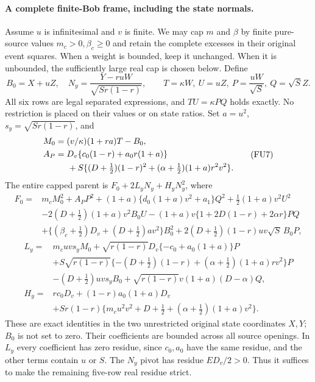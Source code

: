 \paragraph{A complete finite-Bob frame, including the state normals.}
Assume $u$ is infinitesimal and $v$ is finite. We may cap $m$ and
$\beta$ by finite pure-source values $m_c>0,\beta_c\ge0$ and
retain the complete excesses in their original event squares.
When a weight is bounded, keep it unchanged. When it is unbounded,
the sufficiently large real cap is chosen below. Define
\[
 B_0=X+uZ,\quad N_y=\frac{Y-ruW}{\sqrt{Sr(1-r)}},\qquad
 T=\kappa W,\ U=uZ,\ P=\frac{uW}{\sqrt S},\ Q=\sqrt S Z.
 \tag{FU6}
\]
All six rows are legal separated expressions, and $TU=\kappa PQ$
holds exactly. No restriction is placed on their values or on state
ratios. Set $a=u^2$, $s_y=\sqrt{Sr(1-r)}$, and
\[
\begin{split}
 M_0&=(v/\kappa)(1+ra)T-B_0,\\
 A_P&=D_v\{c_0(1-r)+a_0r(1+a)\}\\
 &\hspace{5mm}+S\{(D+\tfrac12)(1-r)^2
       +(\alpha+\tfrac12)(1+a)r^2v^2\}.
\end{split}\tag{FU7}
\]
The entire capped parent is $F_0+2L_yN_y+H_yN_y^2$, where
\[
\begin{split}
 F_0={}&m_cM_0^2+A_PP^2+(1+a)\{d_0(1+a)v^2+a_1\}Q^2
                   +\tfrac12(1+a)v^2U^2\\
 &-2(D+\tfrac12)(1+a)v^2B_0U
 -(1+a)v\{1+2D(1-r)+2\alpha r\}PQ\\
 &+\{(\beta_c+\tfrac12)D_v+(D+\tfrac12)av^2\}B_0^2
 +2(D+\tfrac12)(1-r)uv\sqrt S\,B_0P,
\end{split}\tag{FU8}
\]
\[
\begin{split}
 L_y={}&m_cuvs_yM_0
 +\sqrt{r(1-r)}D_v\{-c_0+a_0(1+a)\}P\\
 &+S\sqrt{r(1-r)}\{-(D+\tfrac12)(1-r)
          +(\alpha+\tfrac12)(1+a)rv^2\}P\\
 &-(D+\tfrac12)uvs_yB_0
       +\sqrt{r(1-r)}v(1+a)(D-\alpha)Q,\\
 H_y={}&rc_0D_v+(1-r)a_0(1+a)D_v\\
 &+Sr(1-r)\{m_cu^2v^2+D+\tfrac12
                      +(\alpha+\tfrac12)(1+a)v^2\}.
\end{split}\tag{FU9}
\]
These are exact identities in the two unrestricted original state
coordinates $X,Y$; $B_0$ is not set to zero. Their coefficients are
bounded across all source openings. In $L_y$ every coefficient has
zero residue, since $c_0,a_0$ have the same residue, and the other
terms contain $u$ or $S$. The $N_y$ pivot has residue $ED_v/2>0$.
Thus it suffices to make the remaining five-row real residue strict.

